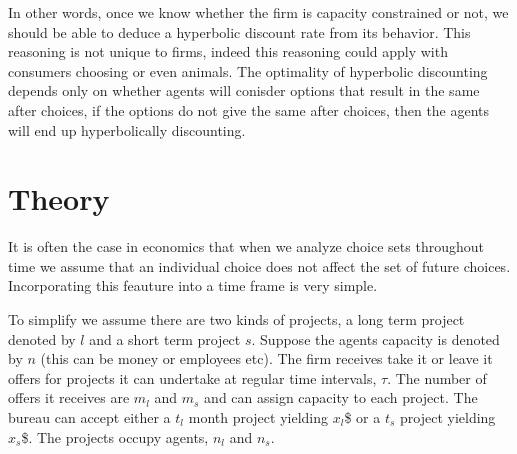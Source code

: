 \documentclass[12pt]{report}
\numberwithin{equation}{section}
\DeclarePairedDelimiter\floor{\lfloor}{\rfloor}
\begin{document}
In other words, once we know whether the firm is capacity constrained or not, we should be able to deduce a hyperbolic discount rate from its behavior. This reasoning is not unique to firms, indeed this reasoning could apply with consumers choosing or even animals. The optimality of hyperbolic discounting depends only on whether agents will conisder options that result in the same after choices, if the options do not give the same after choices, then the agents will end up hyperbolically discounting. 

\section{Theory}

It is often the case in economics that when we analyze choice sets throughout time we assume that an individual choice does not affect the set of future choices. Incorporating this feauture into a time frame is very simple. 

\newpage

To simplify we assume there are two kinds of projects, a long term project denoted by $l$ and a short term project $s$. Suppose the agents capacity is denoted by $n$ (this can be money or employees etc). The firm receives take it or leave it offers for projects it can undertake at regular time intervals, $\tau$. The number of offers it receives are $m_l$ and $m_s$ and can assign capacity to each project. The bureau can accept either a $t_l$ month project yielding $x_l$\$ or a $t_s$ project yielding $x_s$\$. The projects occupy agents, $n_l$ and $n_s$. 

\end{document}
